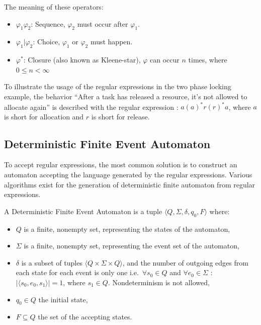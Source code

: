 			The meaning of these operators:
			\begin{itemize}
				\item $\varphi_1 \varphi_2$: Sequence, $\varphi_2$ must occur after $\varphi_1$.
				\item $\varphi_1 | \varphi_2$: Choice, $\varphi_1$ or $\varphi_2$ must happen.
				\item $\varphi^\ast$: Closure (also known as Kleene-star), $\varphi$ can occur $n$ times, where $0 \leq n < \infty$
			\end{itemize}
			
	
			To illustrate the usage of the regular expressions in the two phase locking example, the behavior ``After a task has released a resource, it's not allowed to allocate again'' is described with the regular expression : $a (a)^* r (r)^* a $, where $a$ is short for allocation and $r$ is short for release.
	
	
		\subsection{Deterministic Finite Event Automaton}
			To accept regular expressions, the most common solution is to construct an automaton accepting the language generated by the regular expressions. Various  algorithms exist for the generation of deterministic finite automaton from regular expressions. 
			
			\begin{dfn}
				\label{dfn:cep:ea}
				A Deterministic Finite Event Automaton is a tuple $\langle Q,\Sigma,\delta,q_0, F \rangle$\citep{lam2006compilers} where: 
					\begin{itemize}
						\item $Q$ is a finite, nonempty set, representing the states of the automaton,
						\item $\Sigma$ is a finite, nonempty set, representing the event set of the automaton,
						\item $\delta$ is a subset of tuples $\langle Q \times \Sigma \times Q \rangle$,
							and the number of outgoing edges from each state for each event is only one 
							i.e.~$\forall s_0 \in Q$ and $\forall e_0 \in \Sigma$ : $|\langle s_0, e_0, s_1 \rangle| = 1$, where $s_1 \in Q$. Nondeterminism is not allowed,
						\item $q_0 \in Q$ the initial state,
						\item $F \subseteq Q$ the set of the accepting states.
					\end{itemize}	
			\end{dfn}
		
